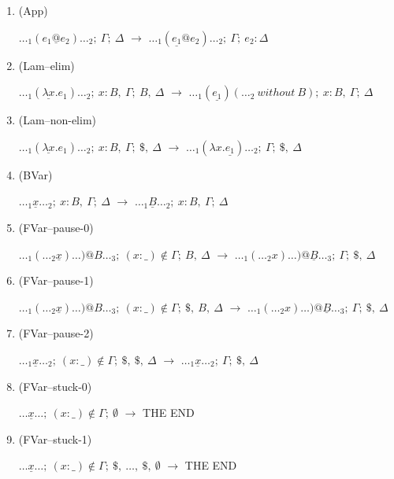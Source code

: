 \documentclass[a4paper, 10pt]{article}
\begin{document}
\begin{enumerate}
\item (App)

$\dots_1 (e_1 \underline{@} e_2) \dots_2;\ \Gamma;\ \Delta$
$\longrightarrow$
$\dots_1 (\underline{e_1} @ e_2) \dots_2;\ \Gamma;\ e_2:\Delta$

\item (Lam--elim)

$\dots_1 (\underline{\lambda x} . e_1) \dots_2;\ x:B,\ \Gamma;\ B,\ \Delta$
$\longrightarrow$
$\dots_1 (\underline{e_1}) (\dots_2\ without\ B);\ x:B,\ \Gamma;\ \Delta$

\item (Lam--non-elim)

$\dots_1 (\underline{\lambda x} . e_1) \dots_2;\ x:B,\ \Gamma;\ \$,\ \Delta$
$\longrightarrow$
$\dots_1 (\lambda x . \underline{e_1}) \dots_2;\ \Gamma;\ \$,\ \Delta$

\item (BVar)

$\dots_1 \underline{x} \dots_2;\ x:B,\ \Gamma;\ \Delta$
$\longrightarrow$
$\dots_1 \underline{B} \dots_2;\ x:B,\ \Gamma;\ \Delta$

\item (FVar--pause-0)

$\dots_1 (\dots_2 \underline{x} )\dots) @ B \dots_3;\ (x:\_) \not\in \Gamma;\ B,\ \Delta$
$\longrightarrow$
$\dots_1 (\dots_2 x )\dots) @ \underline{B} \dots_3;\ \Gamma;\ \$,\ \Delta$

\item (FVar--pause-1)

$\dots_1 (\dots_2 \underline{x} )\dots) @ B \dots_3;\ (x:\_) \not\in \Gamma;\ \$,\ B,\ \Delta$
$\longrightarrow$
$\dots_1 (\dots_2 x )\dots) @ \underline{B} \dots_3;\ \Gamma;\ \$,\ \Delta$

\item (FVar--pause-2)

$\dots_1 \underline{x} \dots_2;\ (x:\_) \not\in \Gamma;\ \$,\ \$,\ \Delta$
$\longrightarrow$
$\dots_1 \underline{x} \dots_2;\ \Gamma;\ \$,\ \Delta$

\item (FVar--stuck-0)

$\dots \underline{x} \dots;\ (x:\_) \not\in \Gamma;\ \emptyset$
$\longrightarrow$
THE END

\item (FVar--stuck-1)

$\dots \underline{x} \dots;\ (x:\_) \not\in \Gamma;\ \$,\ \dots,\ \$,\ \emptyset$
$\longrightarrow$
THE END

\end{enumerate}
\end{document}
